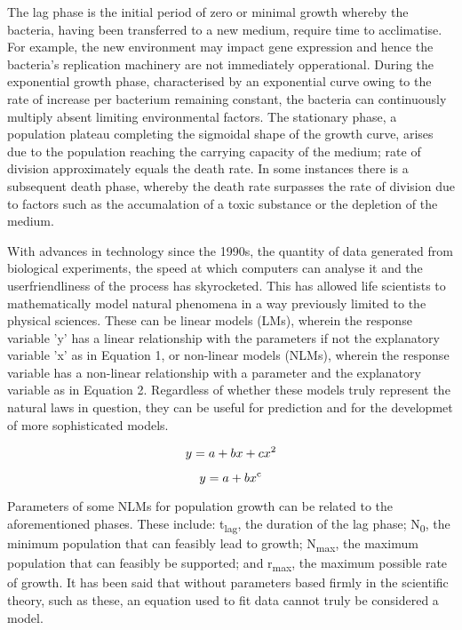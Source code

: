 \documentclass[11pt]{article}
\begin{document}
The lag phase is the initial period of zero or minimal growth whereby the bacteria, having been transferred to a new medium, require time to acclimatise. For example, the new environment may impact gene expression and hence the bacteria's replication machinery are not immediately opperational.\parencite{Buchanan1918} During the exponential growth phase, characterised by an exponential curve owing to the rate of increase per bacterium remaining constant, the bacteria can continuously multiply absent limiting environmental factors.\parencite{Micha2011} The stationary phase, a population plateau completing the sigmoidal shape of the growth curve, arises due to the population reaching the carrying capacity of the medium; rate of division approximately equals the death rate.\parencite{Buchanan1918} In some instances there is a subsequent death phase, whereby the death rate surpasses the rate of division due to factors such as the accumalation of a toxic substance or the depletion of the medium.\parencite{Micha2011} 

With advances in technology since the 1990s, the quantity of data generated from biological experiments, the speed at which computers can analyse it and the userfriendliness of the process has skyrocketed. This has allowed life scientists to mathematically model natural phenomena in a way previously limited to the physical sciences.\parencite{Bolker2013,Johnson2004} These can be linear models (LMs), wherein the response variable 'y' has a linear relationship with the parameters if not the explanatory variable 'x' as in Equation 1, or non-linear models (NLMs), wherein the response variable has a non-linear relationship with a parameter and the explanatory variable as in Equation 2.\parencite{Bolker2013} Regardless of whether these models truly represent the natural laws in question, they can be useful for prediction and for the developmet of more sophisticated models.\parencite{Transtrum2016}

\begin{equation}
    y = a + bx + cx\textsuperscript{2}
\end{equation}

\begin{equation}
    y = a + bx\textsuperscript{c}
\end{equation}
\vspace{2mm}

Parameters of some NLMs for population growth can be related to the aforementioned phases. These include: t\textsubscript{lag}, the duration of the lag phase; N\textsubscript{0}, the minimum population that can feasibly lead to growth; N\textsubscript{max}, the maximum population that can feasibly be supported; and r\textsubscript{max}, the maximum possible rate of growth.\parencite{Micha2011} It has been said that without parameters based firmly in the scientific theory, such as these, an equation used to fit data cannot truly be considered a model.\parencite{Buchanan1997}
\end{document}
